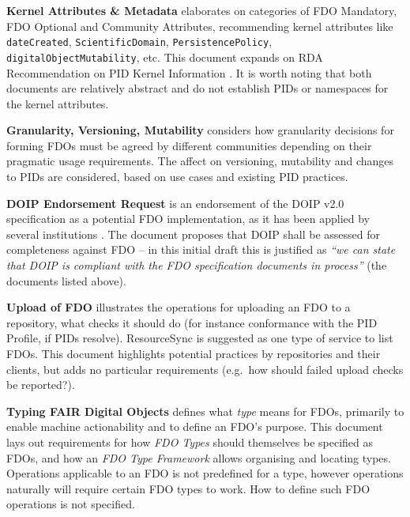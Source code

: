 \documentclass[fleqn,10pt,lineno]{wlpeerjlua}
\begin{document}
\textbf{Kernel Attributes \& Metadata} \autocite{fdo-KernelAttributes} elaborates on categories of FDO Mandatory, FDO Optional and Community Attributes, recommending kernel attributes like \texttt{dateCreated}, \texttt{ScientificDomain}, \texttt{PersistencePolicy}, \texttt{digitalObjectMutability}, etc. This document expands on RDA Recommendation on PID Kernel Information \autocite{weigelRDARecommendationPID2018}. It is worth noting that both documents are relatively abstract and do not establish PIDs or namespaces for the kernel attributes.

\textbf{Granularity, Versioning, Mutability} \autocite{fdo-Granularity} considers how granularity decisions for forming FDOs must be agreed by different communities depending on their pragmatic usage requirements. The affect on versioning, mutability and changes to PIDs are considered, based on use cases and existing PID practices.

\textbf{DOIP Endorsement Request} \autocite{fdo-DOIPEndorsement} is an endorsement of the DOIP v2.0 \autocite{foundationDigitalObjectInterface} specification as a potential FDO implementation, as it has been applied by several institutions \autocite{wittenburgFAIRDigitalObject2022b}. The document proposes that DOIP shall be assessed for completeness against FDO -- in this initial draft this is justified as \emph{``we can state that DOIP is compliant with the FDO specification documents in process''} (the documents listed above).

\textbf{Upload of FDO} \autocite{fdo-FDO-Upload} illustrates the operations for uploading an FDO to a repository, what checks it should do (for instance conformance with the PID Profile, if PIDs resolve). ResourceSync \autocite{ResourceSyncFrameworkSpecification} is suggested as one type of service to list FDOs. This document highlights potential practices by repositories and their clients, but adds no particular requirements (e.g.~how should failed upload checks be reported?).

\textbf{Typing FAIR Digital Objects} \autocite{fdo-TypingFDOs} defines what \emph{type} means for FDOs, primarily to enable machine actionability and to define an FDO's purpose. This document lays out requirements for how \emph{FDO Types} should themselves be specified as FDOs, and how an \emph{FDO Type Framework} allows organising and locating types. Operations applicable to an FDO is not predefined for a type, however operations naturally will require certain FDO types to work. How to define such FDO operations is not specified.
\end{document}
